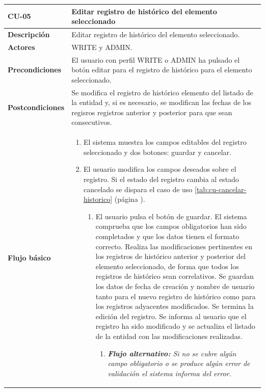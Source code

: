 \begin{table} [H]
    \centering
    \setlength{\leftmargini}{0.4cm}
	\resizebox{15cm}{!} { %
    \begin{tabular}{| m{3cm} | m{12cm} |}   
    \hline
	  \textbf{CU-05} & \textbf{Editar registro de histórico del elemento seleccionado} \\\hline
	  \textbf{Descripción} & Editar registro de histórico del elemento seleccionado. \\\hline
	  \textbf{Actores} & WRITE y ADMIN. \\\hline
	  \textbf{Precondiciones} & El usuario con perfil WRITE o ADMIN ha pulsado el botón editar para el registro de histórico para el elemento seleccionado. \\\hline
	  \textbf{Postcondiciones} & Se modifica el registro de histórico elemento del listado de la entidad  y, si es necesario, se modifican las fechas de los regisros registros anterior y posterior para que sean consecutivos. \\\hline
	  \textbf{Flujo básico} & 
		\begin{enumerate}
	  	\item El sistema muestra los campos editables del registro seleccionado y dos botones: guardar y cancelar.
        \item El usuario modifica los campos deseados sobre el registro. Si el estado del registro cambia al estado cancelado se dispara el caso de uso \ref{tab:cu-cancelar-historico} (página \pageref{tab:cu-cancelar-historico}).
			\begin{enumerate}	
			   \item El usuario pulsa el botón de guardar. El sistema comprueba que los campos obligatorios han sido completados y que los datos tienen el formato correcto. Realiza las modificaciones pertinentes en los registros de histórico anterior y posterior del elemento seleccionado, de forma que todos los registros de histórico sean correlativos. Se guardan los datos de fecha de creación y nombre de usuario tanto para el nuevo registro de histórico como para los registros adyacentes modificados. Se termina la edición del registro. Se informa al usuario que el registro ha sido modificado y se actualiza el listado de la entidad con las modificaciones realizadas.
			   \begin{enumerate}	
			   \item  \textit{\textbf{Flujo alternativo:} Si no se cubre algún campo obligatorio o se produce algún error de validación el sistema informa del error.}

\end{enumerate}
\end{enumerate}
\end{enumerate}
\end{tabular}}
\end{table}

